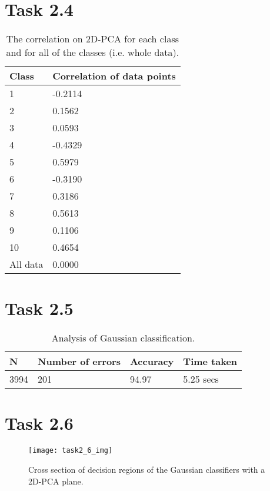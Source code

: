 \documentclass[12pt]{extarticle}
\begin{document}
\section{Task 2.4}
\begin{table}[h!]
\centering
\caption{The correlation on 2D-PCA for each class and for all of the classes (i.e. whole data).}
\begin{tabular}{ |p{3cm}|p{3cm}|  }
 \hline
 Class&Correlation of data points\\
 \hline
 1&-0.2114\\
 2&0.1562\\
 3&0.0593\\
 4&-0.4329\\
 5&0.5979\\
 6&-0.3190\\
 7&0.3186\\
 8&0.5613\\
 9&0.1106\\
 10&0.4654\\
 All data&0.0000\\
 \hline
\end{tabular}
\end{table}

\section{Task 2.5}
\begin{table}[h!]
\centering
\caption{Analysis of Gaussian classification.}
\begin{tabular}{ |p{3cm}|p{3cm}|p{3cm}|p{3cm}|  }
 \hline
 N&Number of errors&Accuracy&Time taken\\
 \hline
 3994&201&94.97&5.25 secs\\
 \hline
\end{tabular}
\end{table}
\pagebreak

\section{Task 2.6}
\begin{figure}[h!]
\caption{Cross section of decision regions of the Gaussian classifiers with a 2D-PCA plane.}
\centering
\texttt{[image: task2\_6\_img]}
\end{figure}
\pagebreak
\end{document}
